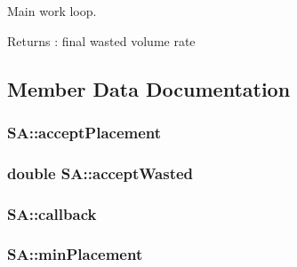 Main work loop. 

\begin{DoxyReturn}{Returns}
\+: final wasted volume rate 
\end{DoxyReturn}


\subsection{Member Data Documentation}
\hypertarget{classSA_a54c2ec1f77612474dc6aec95a788990f}{}
\subsubsection[{accept\+Placement}]{ S\+A\+::accept\+Placement\hspace{0.3cm}{\ttfamily [private]}}\label{classSA_a54c2ec1f77612474dc6aec95a788990f}
\hypertarget{classSA_acf8c139fba3b7a56ac5aab959c4d735d}{}
\subsubsection[{accept\+Wasted}]{\setlength{\rightskip}{0pt plus 5cm}double S\+A\+::accept\+Wasted\hspace{0.3cm}{\ttfamily [private]}}\label{classSA_acf8c139fba3b7a56ac5aab959c4d735d}
\hypertarget{classSA_a10cdd117fe4155341be9239ec2ddec16}{}
\subsubsection[{callback}]{ S\+A\+::callback\hspace{0.3cm}{\ttfamily [private]}}\label{classSA_a10cdd117fe4155341be9239ec2ddec16}
\hypertarget{classSA_a7e672b166a76e7c57d036443536b7bdb}{}
\subsubsection[{min\+Placement}]{ S\+A\+::min\+Placement\hspace{0.3cm}{\ttfamily [private]}}\label{classSA_a7e672b166a76e7c57d036443536b7bdb}
\hypertarget{classSA_a538b1d25b6b4c7683b3bac3212b01b3c}{}
